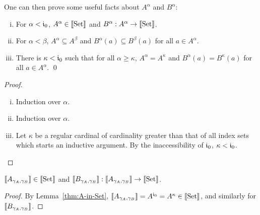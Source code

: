 \documentclass{article}
\begin{document}
One can then prove some useful facts about $A^{\alpha}$ and
  $B^{\alpha}$: %
\begin{lemma} \mbox{}
\label{thm:A-in-Set}
  \begin{enumerate}[(i)]
  \item For $\alpha < \mathfrak{i}_0$, $A^{\alpha} \in \llbracket \text{Set} \rrbracket$ and $B^{\alpha} :
    A^{\alpha} \to \llbracket \text{Set} \rrbracket$.
  \item For $\alpha < \beta$, $A^{\alpha} \subseteq A^{\beta}$ and  $B^{\alpha}(a) \subseteq
    B^{\beta}(a)$ for all $a \in A^{\alpha}$. 
  \item There is $\kappa < \mathfrak{i}_0$ such that for  all $\alpha \geq \kappa$,
    $A^{\alpha} = A^{\kappa}$ and $B^{\alpha}(a) =  B^{\kappa}(a)$ for all $a
    \in A^{\alpha}$. \qed 
  \end{enumerate}
\end{lemma}
\begin{proof}
  \begin{enumerate}[(i)]
  \item Induction over $\alpha$.

  \item Induction over $\alpha$. %
  \item Let $\kappa$ be a regular cardinal of cardinality greater than
    that of all index sets which starts an inductive argument. By the
    inaccessibility of $\mathfrak{i}_0$, $\kappa < \mathfrak{i}_0$.  %
\qedhere
  \end{enumerate}
\end{proof}

\begin{theorem}
  $\llbracket A_{\gamma_A, \gamma_B} \rrbracket \in \llbracket \text{Set} \rrbracket$ and $\llbracket B_{\gamma_A,
      \gamma_B} \rrbracket : \llbracket A_{\gamma_A, \gamma_B} \rrbracket \to \llbracket \text{Set} \rrbracket$.
\end{theorem}
\begin{proof}
  By Lemma~\ref{thm:A-in-Set}, $\llbracket A_{\gamma_A, \gamma_B} \rrbracket = A^{\mathfrak{i}_0} = A^{\kappa} \in
  \llbracket \text{Set} \rrbracket$,  and similarly for $\llbracket B_{\gamma_A, \gamma_B} \rrbracket$. \qedhere
\end{proof}
\end{document}
